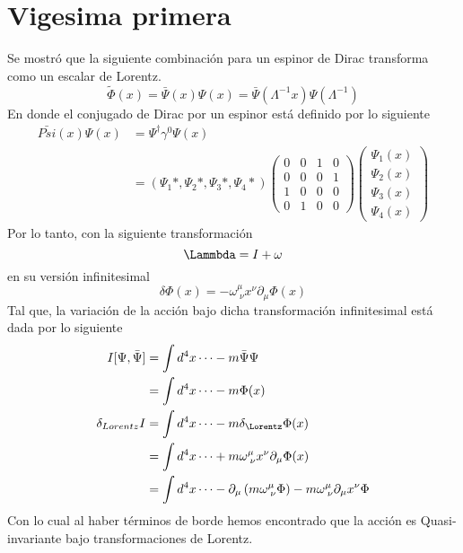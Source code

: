 \documentclass[../main.tex]{subfiles}
\begin{document}
\section{Vigesima primera}
Se mostró que la siguiente combinación para un espinor de Dirac transforma como un escalar de Lorentz.
\begin{equation*}
  \tilde{\Phi}(x)=\bar{\Psi}(x)\Psi(x) = \bar{\Psi}(\Lambda^{-1}x)\Psi(\Lambda^{-1})
\end{equation*}
En donde el conjugado de Dirac por un espinor está definido por lo siguiente
\begin{align*}
  \bar{Psi}(x)\Psi(x) & = \Psi^\dagger \gamma^0 \Psi(x) \\
  & = \left( \Psi_1* , \Psi_2* , \Psi_3* , \Psi_4* \right) \begin{pmatrix}
    0 & 0 & 1 & 0 \\ 0 & 0 & 0 & 1 \\ 1 & 0 & 0 & 0 \\ 0 & 1 & 0 & 0
  \end{pmatrix} \begin{pmatrix}
    \Psi_1(x) \\
    \Psi_2(x) \\
    \Psi_3(x) \\
    \Psi_4(x)
  \end{pmatrix}
\end{align*}
Por lo tanto, con la siguiente transformación
\begin{equation*}
  \Lammbda = I + \omega
\end{equation*}
en su versión infinitesimal
\begin{equation*}
  \delta \Phi(x) = -\omega^\mu_{\; \nu} x^\nu \partial_\mu \Phi(x)
\end{equation*}
Tal que, la variación de la acción bajo dicha transformación infinitesimal está dada por lo siguiente
\begin{align*}
  I[\Psi, \bar{\Psi}] & = \int d^4x \dots -m\bar{\Psi}\Psi \\\
  & = \int d^4x \dots - m\Phi(x) \\
  \delta_{Lorentz}I & = \int d^4x \dots - m\delta_{\Lorentz}\Phi(x) \\
  & = \int d^4x \dots + m\omega^\mu_{\; \nu} x^\nu \partial_\mu \Phi(x) \\
  & = \int d^4x \dots - \partial_\mu \left(m \omega^\mu_{\; \nu} \Phi \right) - m \omega^\mu_{\;\nu} \partial_\mu x^\nu \Phi
\end{align*}
Con lo cual al haber términos de borde hemos encontrado que la acción es Quasi-invariante bajo transformaciones de Lorentz. 
\end{document}
